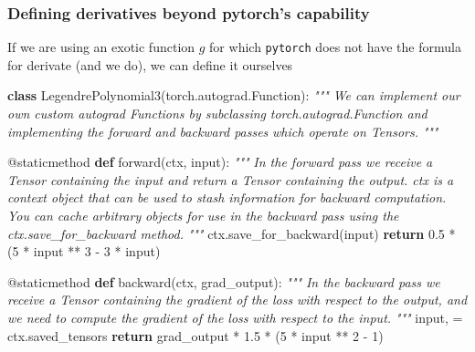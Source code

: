 \documentclass[
]{article}
\newenvironment{Shaded}{}{}
\newcommand{\AttributeTok}[1]{\textcolor[rgb]{0.49,0.56,0.16}{#1}}
\newcommand{\BuiltInTok}[1]{\textcolor[rgb]{0.00,0.50,0.00}{#1}}
\newcommand{\CommentTok}[1]{\textcolor[rgb]{0.38,0.63,0.69}{\textit{#1}}}
\newcommand{\ControlFlowTok}[1]{\textcolor[rgb]{0.00,0.44,0.13}{\textbf{#1}}}
\newcommand{\DecValTok}[1]{\textcolor[rgb]{0.25,0.63,0.44}{#1}}
\newcommand{\FloatTok}[1]{\textcolor[rgb]{0.25,0.63,0.44}{#1}}
\newcommand{\KeywordTok}[1]{\textcolor[rgb]{0.00,0.44,0.13}{\textbf{#1}}}
\newcommand{\NormalTok}[1]{#1}
\newcommand{\OperatorTok}[1]{\textcolor[rgb]{0.40,0.40,0.40}{#1}}
\newcommand{\1}{\boldsymbol{1}}
\begin{document}
\hypertarget{defining-derivatives-beyond-pytorchs-capability}{%
\subsubsection{Defining derivatives beyond pytorch's
capability}\label{defining-derivatives-beyond-pytorchs-capability}}

If we are using an exotic function \(g\) for which \texttt{pytorch} does
not have the formula for derivate (and we do), we can define it
ourselves

\begin{Shaded}
\begin{Highlighting}[]
\KeywordTok{class}\NormalTok{ LegendrePolynomial3(torch.autograd.Function):}
    \CommentTok{"""}
\CommentTok{    We can implement our own custom autograd Functions by subclassing}
\CommentTok{    torch.autograd.Function and implementing the forward and backward passes}
\CommentTok{    which operate on Tensors.}
\CommentTok{    """}

    \AttributeTok{@staticmethod}
    \KeywordTok{def}\NormalTok{ forward(ctx, }\BuiltInTok{input}\NormalTok{):}
        \CommentTok{"""}
\CommentTok{        In the forward pass we receive a Tensor containing the input and return}
\CommentTok{        a Tensor containing the output. ctx is a context object that can be used}
\CommentTok{        to stash information for backward computation. You can cache arbitrary}
\CommentTok{        objects for use in the backward pass using the ctx.save\_for\_backward method.}
\CommentTok{        """}
\NormalTok{        ctx.save\_for\_backward(}\BuiltInTok{input}\NormalTok{)}
        \ControlFlowTok{return} \FloatTok{0.5} \OperatorTok{*}\NormalTok{ (}\DecValTok{5} \OperatorTok{*} \BuiltInTok{input} \OperatorTok{**} \DecValTok{3} \OperatorTok{{-}} \DecValTok{3} \OperatorTok{*} \BuiltInTok{input}\NormalTok{)}

    \AttributeTok{@staticmethod}
    \KeywordTok{def}\NormalTok{ backward(ctx, grad\_output):}
        \CommentTok{"""}
\CommentTok{        In the backward pass we receive a Tensor containing the gradient of the loss}
\CommentTok{        with respect to the output, and we need to compute the gradient of the loss}
\CommentTok{        with respect to the input.}
\CommentTok{        """}
        \BuiltInTok{input}\NormalTok{, }\OperatorTok{=}\NormalTok{ ctx.saved\_tensors}
        \ControlFlowTok{return}\NormalTok{ grad\_output }\OperatorTok{*} \FloatTok{1.5} \OperatorTok{*}\NormalTok{ (}\DecValTok{5} \OperatorTok{*} \BuiltInTok{input} \OperatorTok{**} \DecValTok{2} \OperatorTok{{-}} \DecValTok{1}\NormalTok{)}
\end{Highlighting}
\end{Shaded}
\end{document}
